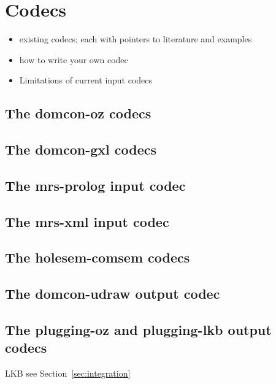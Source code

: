 
\section{Codecs}  \label{sec:codecs}




\begin{itemize}
\item existing codecs; each with pointers to literature and examples
\item how to write your own codec
\item Limitations of current input codecs
\end{itemize}



\subsection{The domcon-oz codecs}

\subsection{The domcon-gxl codecs}

\subsection{The mrs-prolog input codec}

\cite{mrs-dom}

\subsection{The mrs-xml input codec}

\subsection{The holesem-comsem codecs}

\cite{KolNieTha03}

\subsection{The domcon-udraw output codec}

\subsection{The plugging-oz and plugging-lkb output codecs}

LKB see Section~\ref{sec:integration}

